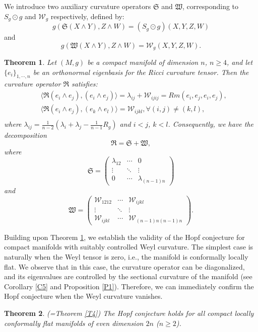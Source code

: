 \documentclass[12pt, twoside]{article}
\newtheorem{theorem}{Theorem}[section]
\theoremstyle{definition}
\numberwithin{equation}{section}
\def \la {\lambda}
\begin{document}
We introduce two auxiliary curvature operators $\mathfrak{S}$ and $\mathfrak{W}$, corresponding to $S_{g} \odot g$ and $\mathcal{W}_{g}$ respectively, defined by:
$$g(\mathfrak{S}(X\wedge Y),Z\wedge W)=(S_{g}\odot g)(X,Y,Z,W)$$ and$$ g(\mathfrak{W}(X\wedge Y),Z\wedge W)=\mathcal{W}_{g}(X,Y,Z,W).$$
\begin{theorem}\label{T3}
	Let $(M,g)$ be a compact manifold of dimension $n$, $n\geq4$, and let $\{e_{i}\}_{1,\cdots,n}$ be an orthonormal eigenbasis for the Ricci curvature tensor. Then the curvature operator $\mathfrak{R}$ satisfies:
	\begin{equation*}
	\begin{split}
	&\langle\mathfrak{R}(e_{i}\wedge e_{j}),(e_{i}\wedge e_{j})\rangle=\la_{ij}+\mathcal{W}_{ijij}=Rm(e_{i},e_{j},e_{i},e_{j}),\\
	&\langle\mathfrak{R}(e_{i}\wedge e_{j}),(e_{k}\wedge e_{l})\rangle=\mathcal{W}_{ijkl},\forall (i,j)\neq (k,l),\\
	\end{split}
	\end{equation*}
	where $\lambda_{ij}=\frac{1}{n-2}\left(\lambda_{i} + \lambda_{j} - \frac{1}{n-1}R_{g}\right)$ and $i<j$, $k<l$. Consequently, we have the decomposition $$\mathfrak{R} = \mathfrak{S} + \mathfrak{W},$$
		where
		$$\mathfrak{S}=\left(\begin{array}{ccc}\la_{12} & \cdots & 0 \\ \vdots & \ddots & \vdots \\0 & \cdots & \la_{(n-1)n}\end{array}\right)$$
		and
		$$\mathfrak{W}=\left(\begin{array}{ccc}\mathcal{W}_{1212} &\cdots  & \mathcal{W}_{ijkl} \\ \vdots &\ddots & \vdots \\ \mathcal{W}_{ijkl}  & \cdots & \mathcal{W}_{(n-1)n(n-1)n}\end{array}\right).$$
\end{theorem}
Building upon Theorem \ref{T3}, we establish the validity of the Hopf conjecture for compact manifolds with suitably controlled Weyl curvature. The simplest case is naturally when the Weyl tensor is zero, i.e., the manifold is conformally locally flat. We observe that in this case, the curvature operator can be diagonalized, and its eigenvalues are controlled by the sectional curvature of the manifold (see Corollary \ref{C5} and Proposition \ref{P1}). Therefore, we can immediately confirm the Hopf conjecture when the Weyl curvature vanishes.
\begin{theorem}(=Theorem \ref{T4})
	The Hopf conjecture holds for all compact locally conformally flat manifolds of even dimension $2n$ ($n \geq 2$).
\end{theorem}
\end{document}
